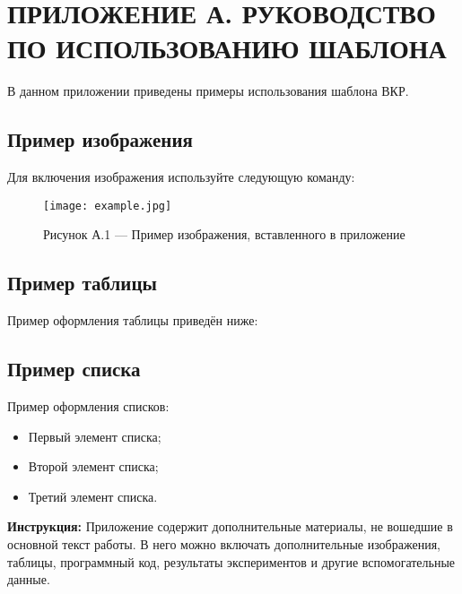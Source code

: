\chapter*{ПРИЛОЖЕНИЕ А. РУКОВОДСТВО ПО ИСПОЛЬЗОВАНИЮ ШАБЛОНА}

В данном приложении приведены примеры использования шаблона ВКР.

\section*{Пример изображения}
Для включения изображения используйте следующую команду:
\begin{figure}[h!]
\centering
\texttt{[image: example.jpg]}
\caption{Рисунок А.1 --- Пример изображения, вставленного в приложение}
\end{figure}

\section*{Пример таблицы}
Пример оформления таблицы приведён ниже:
\ExampleMultiLevelTable
\ExampleSplitTable

\section*{Пример списка}
Пример оформления списков:
\begin{itemize}
  \item Первый элемент списка;
  \item Второй элемент списка;
  \item Третий элемент списка.
\end{itemize}

\bigskip
\textbf{Инструкция:} Приложение содержит дополнительные материалы, не вошедшие в основной текст работы. В него можно включать дополнительные изображения, таблицы, программный код, результаты экспериментов и другие вспомогательные данные.
